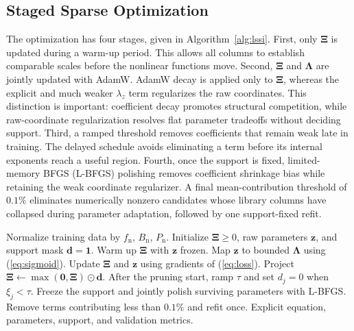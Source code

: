 \documentclass[lettersize,journal]{IEEEtran}
\newcommand{\vect}[1]{\boldsymbol{#1}}
\begin{document}
\subsection{Staged Sparse Optimization}

The optimization has four stages, given in Algorithm~\ref{alg:lssi}. First, only $\vect{\Xi}$ is updated during a warm-up period. This allows all columns to establish comparable scales before the nonlinear functions move. Second, $\vect{\Xi}$ and $\vect{\Lambda}$ are jointly updated with AdamW. AdamW decay is applied only to $\vect{\Xi}$, whereas the explicit and much weaker $\lambda_z$ term regularizes the raw coordinates. This distinction is important: coefficient decay promotes structural competition, while raw-coordinate regularization resolves flat parameter tradeoffs without deciding support. Third, a ramped threshold removes coefficients that remain weak late in training. The delayed schedule avoids eliminating a term before its internal exponents reach a useful region. Fourth, once the support is fixed, limited-memory BFGS (L-BFGS) polishing removes coefficient shrinkage bias while retaining the weak coordinate regularizer. A final mean-contribution threshold of $0.1\%$ eliminates numerically nonzero candidates whose library columns have collapsed during parameter adaptation, followed by one support-fixed refit.

\begin{algorithm}[t]
\caption{Learnable Symbolic Sparse Identification}
\label{alg:lssi}
\begin{algorithmic}[1]
\STATE Normalize training data by $f_{\mathrm{n}}$, $B_{\mathrm{n}}$, $P_{\mathrm{n}}$.
\STATE Initialize $\vect{\Xi}\geq0$, raw parameters $\vect{z}$, and support mask $\vect{d}=\vect{1}$.
\STATE Warm up $\vect{\Xi}$ with $\vect{z}$ frozen.
  \STATE Map $\vect{z}$ to bounded $\vect{\Lambda}$ using (\ref{eq:sigmoid}).
  \STATE Update $\vect{\Xi}$ and $\vect{z}$ using gradients of (\ref{eq:loss}).
  \STATE Project $\vect{\Xi}\leftarrow\max(\vect{0},\vect{\Xi})\odot\vect{d}$.
  \STATE After the pruning start, ramp $\tau$ and set $d_j=0$ when $\xi_j<\tau$.
\ENDFOR
\STATE Freeze the support and jointly polish surviving parameters with L-BFGS.
\STATE Remove terms contributing less than $0.1\%$ and refit once.
\RETURN Explicit equation, parameters, support, and validation metrics.
\end{algorithmic}
\end{algorithm}
\end{document}
